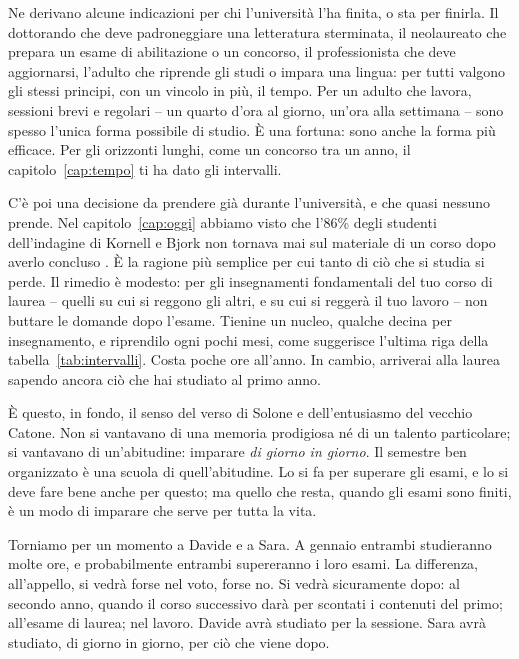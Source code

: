 Ne derivano alcune indicazioni per chi l'università l'ha finita, o sta
per finirla. Il dottorando che deve padroneggiare una letteratura
sterminata, il neolaureato che prepara un esame di abilitazione o un
concorso, il professionista che deve aggiornarsi, l'adulto che riprende
gli studi o impara una lingua: per tutti valgono gli stessi principi,
con un vincolo in più, il tempo. Per un adulto che lavora, sessioni
brevi e regolari -- un quarto d'ora al giorno, un'ora alla settimana --
sono spesso l'unica forma possibile di studio. È una fortuna: sono
anche la forma più efficace. Per gli orizzonti lunghi, come un concorso
tra un anno, il capitolo~\ref{cap:tempo} ti ha dato gli intervalli.

C'è poi una decisione da prendere già durante l'università, e che
quasi nessuno prende. Nel capitolo~\ref{cap:oggi} abbiamo visto che
l'86\% degli studenti dell'indagine di Kornell e Bjork non tornava mai
sul materiale di un corso dopo averlo concluso \parencite{kornell2007}.
È la ragione più semplice per cui tanto di ciò che si studia si perde.
Il rimedio è modesto: per gli insegnamenti fondamentali del tuo corso
di laurea -- quelli su cui si reggono gli altri, e su cui si reggerà il
tuo lavoro -- non buttare le domande dopo l'esame. Tienine un nucleo,
qualche decina per insegnamento, e riprendilo ogni pochi mesi, come
suggerisce l'ultima riga della tabella~\ref{tab:intervalli}. Costa
poche ore all'anno. In cambio, arriverai alla laurea sapendo ancora ciò
che hai studiato al primo anno.

È questo, in fondo, il senso del verso di Solone e dell'entusiasmo del
vecchio Catone. Non si vantavano di una memoria prodigiosa né di un
talento particolare; si vantavano di un'abitudine: imparare
\emph{di giorno in giorno}. Il semestre ben organizzato è una scuola
di quell'abitudine. Lo si fa per superare gli esami, e lo si deve fare
bene anche per questo; ma quello che resta, quando gli esami sono
finiti, è un modo di imparare che serve per tutta la vita.

\asterismo

Torniamo per un momento a Davide e a Sara. A gennaio entrambi
studieranno molte ore, e probabilmente entrambi supereranno i loro
esami. La differenza, all'appello, si vedrà forse nel voto, forse no.
Si vedrà sicuramente dopo: al secondo anno, quando il corso successivo
darà per scontati i contenuti del primo; all'esame di laurea; nel
lavoro. Davide avrà studiato per la sessione. Sara avrà studiato, di
giorno in giorno, per ciò che viene dopo.

